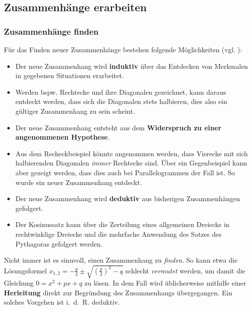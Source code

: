 \documentclass[
]{scrbook}
\renewenvironment{quote}{
  \list{}{
	\leftmargin0.2cm   %
    \rightmargin\leftmargin
      	\def\FrameCommand
    {%
        {\color{quoteColor}\vrule width 2pt}%
        \hspace{0pt}%
    }%
    \MakeFramed{\advance \hsize -\width \FrameRestore}    \color{quoteColor}
    }
  \item\relax
}
{\endlist\color{black}\endMakeFramed}
\theoremstyle{definition}
\theoremstyle{definition}
\theoremstyle{definition}
\theoremstyle{definition}
\theoremstyle{remark}
\begin{document}
\subsection{Zusammenhänge erarbeiten}\label{zusammenhuxe4nge-erarbeiten}

\subsubsection{Zusammenhänge finden}\label{zusammenhuxe4nge-finden}

Für das Finden neuer Zusammenhänge bestehen folgende Möglichkeiten (vgl. ):

\begin{itemize}
\item
  Der neue Zusammenhang wird \textbf{induktiv} über das Entdecken von Merkmalen in gegebenen Situationen erarbeitet.

  \begin{quote}
  Werden bspw. Rechtecke und ihre Diagonalen gezeichnet, kann daraus entdeckt werden, dass sich die Diagonalen stets halbieren, dies also ein gültiger Zusammenhang zu sein scheint.
  \end{quote}
\item
  Der neue Zusammenhang entsteht aus dem \textbf{Widerspruch zu einer angenommenen Hypothese}.

  \begin{quote}
  Aus dem Recheckbeispiel könnte angenommen werden, dass Vierecke mit sich halbierenden Diagonalen \emph{immer} Rechtecke sind. Über ein Gegenbeispiel kann aber gezeigt werden, dass dies auch bei Parallelogrammen der Fall ist. So wurde ein neuer Zusammenhang entdeckt.
  \end{quote}
\item
  Der neue Zusammenhang wird \textbf{deduktiv} aus bisherigen Zusammenhängen gefolgert.

  \begin{quote}
  Der Kosinussatz kann über die Zerteilung eines allgemeinen Dreiecks in rechtwinklige Dreiecke und die mehrfache Anwendung des Satzes des Pythagoras gefolgert werden.
  \end{quote}
\end{itemize}

Nicht immer ist es sinnvoll, einen Zusammenhang zu \emph{finden}. So kann etwa die Lösungsformel \(x_{1,2} = -\frac{p}{2}\pm \sqrt{\left(\frac{p}{2}\right)^2-q}\) schlecht \emph{vermutet} werden, um damit die Gleichung \(0 = x^2+px+q\) zu lösen. In dem Fall wird üblicherweise mithilfe einer \textbf{Herleitung} direkt zur Begründung des Zusammenhangs übergegangen. Ein solches Vorgehen ist i.~d.~R. deduktiv.
\end{document}
